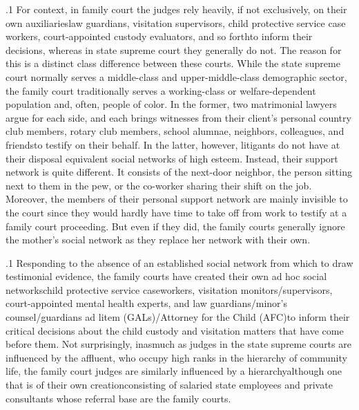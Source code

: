 \documentclass[11pt, twoside]{article}
\begin{document}
{\p.1{%
For context, in family court the judges rely heavily, if not exclusively, on their own auxiliaries\mdash{}law guardians, visitation supervisors,
child protective service case workers, court-appointed custody evaluators, and so forth\mdash{}to inform their decisions, whereas in state supreme
court they generally do not. The reason for this is a distinct class difference between these courts. While the state supreme court normally
serves a middle-class and upper-middle-class demographic sector, the
family court traditionally serves a working-class or welfare-dependent
population and, often, people of color. In the former, two matrimonial
lawyers argue for each side, and each brings witnesses from their client’s
personal \mdash{}country club members, rotary club members, school alumnae, neighbors, colleagues, and friends\mdash{}to testify on
their behalf. In the latter, however, litigants do not have at their disposal
equivalent social networks of high esteem. Instead, their support network is quite different. It consists of the next-door neighbor, the person
sitting next to them in the pew, or the co-worker sharing their shift on
the job. Moreover, the members of their personal support network are
mainly invisible to the court since they would hardly have time to
take off from work to testify at a family court proceeding. But even if
they did, the family courts generally ignore the mother’s social network
as they replace her network with their own.
}%

\p.1{%
Responding to the absence of an established social network from
which to draw testimonial evidence, the family courts have created their
own ad hoc social networks\mdash{}child protective service caseworkers, visitation monitors/supervisors, court-appointed mental health experts,
and law guardians/minor’s counsel/guardians ad litem (GALs)/Attorney
for the Child (AFC)\mdash{}to inform their critical decisions about the child
custody and visitation matters that have come before them. Not
surprisingly, inasmuch as judges in the state supreme courts are influenced by
the affluent, who occupy high ranks in the hierarchy of community
life, the family court judges are similarly influenced
by a hierarchy\mdash{}although one that is of their own creation\mdash{}consisting of salaried state
employees and private consultants whose referral base are the family
courts.
}%

}
\end{document}
